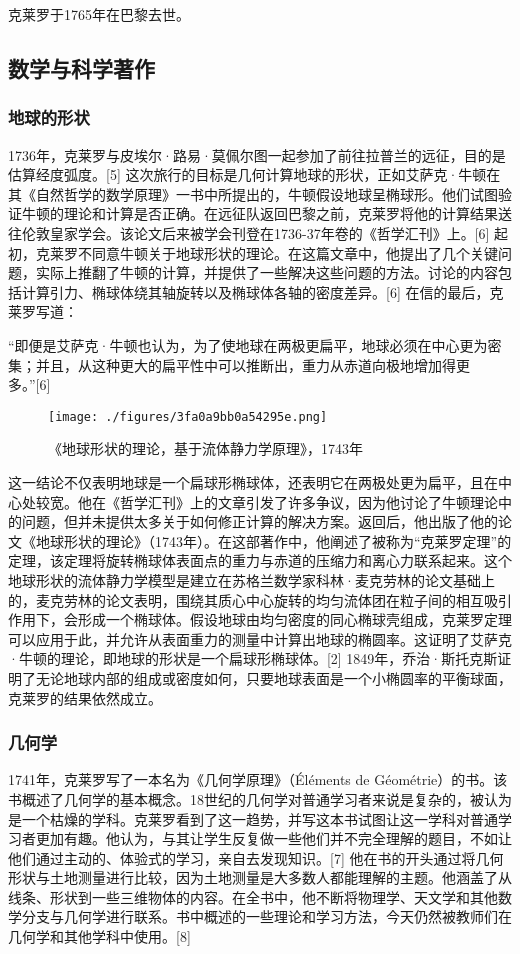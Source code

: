克莱罗于1765年在巴黎去世。
\subsection{数学与科学著作}  
\subsubsection{地球的形状}  
1736年，克莱罗与皮埃尔·路易·莫佩尔图一起参加了前往拉普兰的远征，目的是估算经度弧度。[5] 这次旅行的目标是几何计算地球的形状，正如艾萨克·牛顿在其《自然哲学的数学原理》一书中所提出的，牛顿假设地球呈椭球形。他们试图验证牛顿的理论和计算是否正确。在远征队返回巴黎之前，克莱罗将他的计算结果送往伦敦皇家学会。该论文后来被学会刊登在1736-37年卷的《哲学汇刊》上。[6] 起初，克莱罗不同意牛顿关于地球形状的理论。在这篇文章中，他提出了几个关键问题，实际上推翻了牛顿的计算，并提供了一些解决这些问题的方法。讨论的内容包括计算引力、椭球体绕其轴旋转以及椭球体各轴的密度差异。[6] 在信的最后，克莱罗写道：

“即便是艾萨克·牛顿也认为，为了使地球在两极更扁平，地球必须在中心更为密集；并且，从这种更大的扁平性中可以推断出，重力从赤道向极地增加得更多。”[6]
\begin{figure}[ht]
\centering
\texttt{[image: ./figures/3fa0a9bb0a54295e.png]}
\caption{《地球形状的理论，基于流体静力学原理》，1743年} \label{fig_Alexis_2}
\end{figure}
这一结论不仅表明地球是一个扁球形椭球体，还表明它在两极处更为扁平，且在中心处较宽。他在《哲学汇刊》上的文章引发了许多争议，因为他讨论了牛顿理论中的问题，但并未提供太多关于如何修正计算的解决方案。返回后，他出版了他的论文《地球形状的理论》（1743年）。在这部著作中，他阐述了被称为“克莱罗定理”的定理，该定理将旋转椭球体表面点的重力与赤道的压缩力和离心力联系起来。这个地球形状的流体静力学模型是建立在苏格兰数学家科林·麦克劳林的论文基础上的，麦克劳林的论文表明，围绕其质心中心旋转的均匀流体团在粒子间的相互吸引作用下，会形成一个椭球体。假设地球由均匀密度的同心椭球壳组成，克莱罗定理可以应用于此，并允许从表面重力的测量中计算出地球的椭圆率。这证明了艾萨克·牛顿的理论，即地球的形状是一个扁球形椭球体。[2] 1849年，乔治·斯托克斯证明了无论地球内部的组成或密度如何，只要地球表面是一个小椭圆率的平衡球面，克莱罗的结果依然成立。
\subsubsection{几何学}  
1741年，克莱罗写了一本名为《几何学原理》（Éléments de Géométrie）的书。该书概述了几何学的基本概念。18世纪的几何学对普通学习者来说是复杂的，被认为是一个枯燥的学科。克莱罗看到了这一趋势，并写这本书试图让这一学科对普通学习者更加有趣。他认为，与其让学生反复做一些他们并不完全理解的题目，不如让他们通过主动的、体验式的学习，亲自去发现知识。[7] 他在书的开头通过将几何形状与土地测量进行比较，因为土地测量是大多数人都能理解的主题。他涵盖了从线条、形状到一些三维物体的内容。在全书中，他不断将物理学、天文学和其他数学分支与几何学进行联系。书中概述的一些理论和学习方法，今天仍然被教师们在几何学和其他学科中使用。[8]
